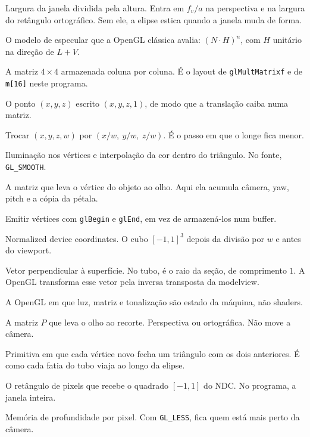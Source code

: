 \documentclass[11pt,a4paper]{article}
\newcommand{\fn}[1]{\texttt{\nobreak\hspace{0pt}#1}}
\begin{document}
\begin{description}[
  leftmargin=0pt,
  style=nextline,
  font=\sffamily\bfseries,
  itemsep=0.35em]
\item[Aspect]
Largura da janela dividida pela altura. Entra em \(f_{\!v}/a\) na perspectiva e na largura do retângulo ortográfico. Sem ele, a elipse estica quando a janela muda de forma.

\item[Blinn--Phong]
O modelo de especular que a OpenGL clássica avalia: \((N\cdot H)^{n}\), com \(H\) unitário na direção de \(L + V\).

\item[Column-major]
A matriz \(4\times 4\) armazenada coluna por coluna. É o layout de \fn{glMultMatrixf} e de \fn{m[16]} neste programa.

\item[Coordenada homogênea]
O ponto \((x, y, z)\) escrito \((x, y, z, 1)\), de modo que a translação caiba numa matriz.

\item[Divisão perspectiva]
Trocar \((x, y, z, w)\) por \((x/w,\ y/w,\ z/w)\). É o passo em que o longe fica menor.

\item[Gouraud]
Iluminação nos vértices e interpolação da cor dentro do triângulo. No fonte, \fn{GL\_SMOOTH}.

\item[Modelview]
A matriz que leva o vértice do objeto ao olho. Aqui ela acumula câmera, yaw, pitch e a cópia da pétala.

\item[Modo imediato]
Emitir vértices com \fn{glBegin} e \fn{glEnd}, em vez de armazená-los num buffer.

\item[NDC]
Normalized device coordinates. O cubo \([-1, 1]^3\) depois da divisão por \(w\) e antes do viewport.

\item[Normal]
Vetor perpendicular à superfície. No tubo, é o raio da seção, de comprimento \(1\). A OpenGL transforma esse vetor pela inversa transposta da modelview.

\item[Pipeline fixo]
A OpenGL em que luz, matriz e tonalização são estado da máquina, não shaders.

\item[Projeção]
A matriz \(P\) que leva o olho ao recorte. Perspectiva ou ortográfica. Não move a câmera.

\item[Triangle strip]
Primitiva em que cada vértice novo fecha um triângulo com os dois anteriores. É como cada fatia do tubo viaja ao longo da elipse.

\item[Viewport]
O retângulo de pixels que recebe o quadrado \([-1, 1]\) do NDC. No programa, a janela inteira.

\item[Z-buffer]
Memória de profundidade por pixel. Com \fn{GL\_LESS}, fica quem está mais perto da câmera.
\end{description}
\end{document}
